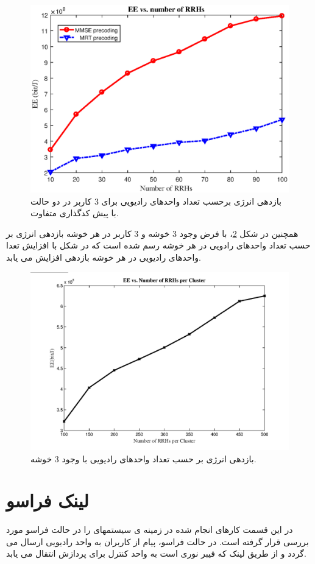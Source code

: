 \begin{figure}[H]
  \centering
    \includegraphics[width=\linewidth]{./fig/precode}
  \caption{
  بازدهی انرژی برحسب تعداد واحدهای رادیویی برای 3 کاربر در دو حالت با پیش کدگذاری متفاوت. }
  \label{fig:precode}
  \end{figure}
  همچنین در شکل \ref{fig:clus}، با فرض وجود 3 خوشه و 3 کاربر در هر خوشه بازدهی انرژی بر حسب تعداد واحدهای رادویی در هر خوشه رسم شده است که در شکل با افزایش تعدا واحدهای رادیویی در هر خوشه بازدهی افزایش می یابد.
  \begin{figure}[H]
  \centering
    \includegraphics[width=\linewidth]{./fig/f2}
  \caption{
  بازدهی انرژی بر حسب تعداد واحدهای رادیویی با وجود 3 خوشه. }
  \label{fig:clus}
  \end{figure}
\section{لینک فراسو}
در این قسمت کارهای انجام شده در زمینه ی سیستمهای    را در حالت فراسو مورد بررسی قرار گرفته است. در حالت فراسو، پیام از کاربران به واحد رادیویی ارسال می گردد و از طریق لینک  که فیبر نوری است به واحد کنترل برای پردازش انتقال می یابد.
